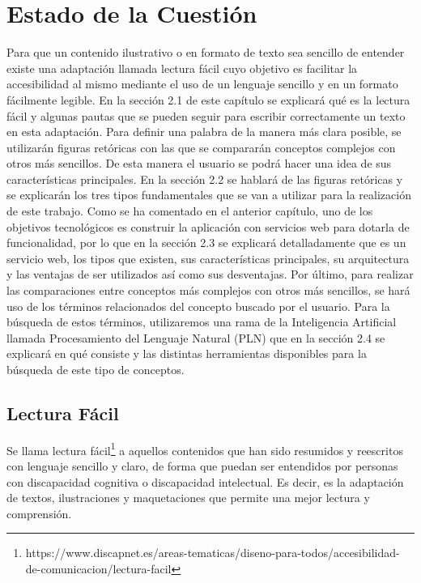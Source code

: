 \chapter{Estado de la Cuestión}
\label{cap:estadoDeLaCuestion}


Para que un contenido ilustrativo o en formato de texto sea sencillo de entender existe una adaptación llamada lectura fácil cuyo objetivo es facilitar la accesibilidad al mismo mediante el uso de un lenguaje sencillo y en un formato fácilmente legible. En la sección 2.1 de este capítulo se explicará qué es la lectura fácil y algunas pautas que se pueden seguir para escribir correctamente un texto en esta adaptación. Para definir una palabra de la manera más clara posible, se utilizarán figuras retóricas con las que se compararán conceptos complejos con otros más sencillos. De esta manera el usuario se podrá hacer una idea de sus características principales. En la sección 2.2 se hablará de las figuras retóricas y se explicarán los tres tipos fundamentales que se van a utilizar para la realización de este trabajo. 
Como se ha comentado en el anterior capítulo, uno de los objetivos tecnológicos es construir la aplicación con servicios web para dotarla de funcionalidad, por lo que en la sección 2.3 se explicará detalladamente que es un servicio web, los tipos que existen, sus características principales, su arquitectura y las ventajas de ser utilizados así como sus desventajas. Por último, para realizar las comparaciones entre conceptos más complejos con otros más sencillos, se hará uso de los términos relacionados del concepto buscado por el usuario.
Para la búsqueda de estos términos, utilizaremos una rama de la Inteligencia Artificial llamada Procesamiento del Lenguaje Natural (PLN) que en la sección 2.4 se explicará en qué consiste y las distintas herramientas disponibles para la búsqueda de este tipo de conceptos.

\section{Lectura Fácil}
\label{cap:sec:lecturafacil}

Se llama lectura fácil\footnote{https://www.discapnet.es/areas-tematicas/diseno-para-todos/accesibilidad-de-comunicacion/lectura-facil} a aquellos contenidos que han sido resumidos y reescritos con lenguaje sencillo y claro, de forma que puedan ser entendidos por personas con discapacidad cognitiva o discapacidad intelectual. Es decir, es la adaptación de textos, ilustraciones y maquetaciones que permite una mejor lectura y comprensión.

